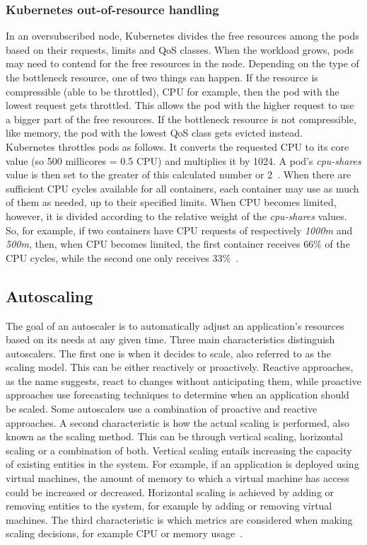 \subsubsection{Kubernetes out-of-resource handling}\label{background:oversubscription}

In an oversubscribed node, Kubernetes divides the free resources among the pods based on their requests, limits and QoS classes. When the workload grows, pods may need to contend for the free resources in the node. Depending on the type of the bottleneck resource, one of two things can happen. If the resource is compressible (able to be throttled), CPU for example, then the pod with the lowest request gets throttled. This allows the pod with the higher request to use a bigger part of the free resources. If the bottleneck resource is not compressible, like memory, the pod with the lowest QoS class gets evicted instead. \\

Kubernetes throttles pods as follows. It converts the requested CPU to its core value (so 500 millicores = 0.5 CPU) and multiplies it by 1024. A pod's \textit{cpu-shares} value is then set to the greater of this calculated number or 2~\citep{Kubernetes-cpu-shares}. When there are sufficient CPU cycles available for all containers, each container may use as much of them as needed, up to their specified limits. When CPU becomes limited, however, it is divided according to the relative weight of the \textit{cpu-shares} values. So, for example, if two containers have CPU requests of respectively \textit{1000m} and \textit{500m}, then, when CPU becomes limited, the first container receives 66\% of the CPU cycles, while the second one only receives 33\%~\citep{Docker-cpu-shares}.\\

\subsection{Autoscaling}
The goal of an autoscaler is to automatically adjust an application's resources based on its needs at any given time. Three main characteristics distinguish autoscalers. 
The first one is when it decides to scale, also referred to as the scaling model. This can be either reactively or proactively. Reactive approaches, as the name suggests, react to changes without anticipating them, while proactive approaches use forecasting techniques to determine when an application should be scaled. Some autoscalers use a combination of proactive and reactive approaches. 
A second characteristic is how the actual scaling is performed, also known as the scaling method. This can be through vertical scaling, horizontal scaling or a combination of both. Vertical scaling entails increasing the capacity of existing entities in the system. For example, if an application is deployed using virtual machines, the amount of memory to which a virtual machine has access could be increased or decreased. Horizontal scaling is achieved by adding or removing entities to the system, for example by adding or removing virtual machines. The third characteristic is which metrics are considered when making scaling decisions, for example CPU or memory usage~\citep{CoutinhoEmanuel2015Eicc}. 

